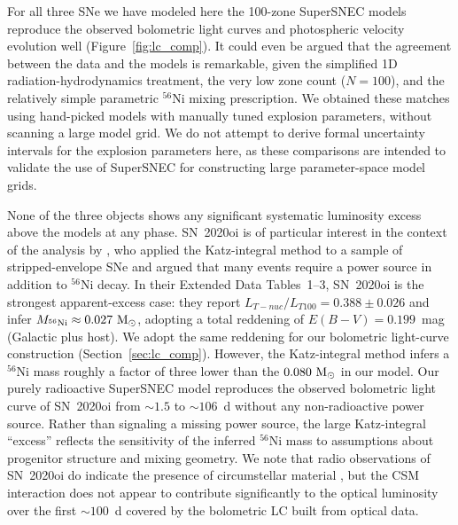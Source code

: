 \documentclass[twocolumn,linenumbers]{aastex701}
\begin{document}
For all three SNe we have modeled here the 100-zone SuperSNEC models reproduce the observed bolometric light curves and photospheric velocity evolution well (Figure~\ref{fig:lc_comp}). It could even be argued that the agreement between the data and the models is remarkable, given the simplified 1D radiation-hydrodynamics treatment, the very low zone count ($N = 100$), and the relatively simple parametric $^{56}$Ni mixing prescription. We obtained these matches using hand-picked models with manually tuned explosion parameters, without scanning a large model grid. We do not attempt to derive formal uncertainty intervals for the explosion parameters here, as these comparisons are intended to validate the use of SuperSNEC for constructing large parameter-space model grids. 

None of the three objects shows any significant systematic luminosity excess above the models at any phase. SN~2020oi is of particular interest in the context of the analysis by \citet{Rodriguez2024}, who applied the Katz-integral method to a sample of stripped-envelope SNe and argued that many events require a power source in addition to $^{56}$Ni decay. In their Extended Data Tables~1--3, SN~2020oi is the strongest apparent-excess case: they report $L_{T-nuc}/L_{T100} = 0.388 \pm 0.026$ and infer $M_{^{56}\mathrm{Ni}} \approx 0.027~{\rm M}_\odot$, adopting a total reddening of $E(B-V) = 0.199$~mag (Galactic plus host). We adopt the same reddening for our bolometric light-curve construction (Section~\ref{sec:lc_comp}). However, the Katz-integral method infers a $^{56}$Ni mass roughly a factor of three lower than the $0.080~{\rm M}_\odot$ in our model. Our purely radioactive SuperSNEC model reproduces the observed bolometric light curve of SN~2020oi from ${\sim}1.5$ to ${\sim}106$~d without any non-radioactive power source. Rather than signaling a missing power source, the large Katz-integral ``excess'' reflects the sensitivity of the inferred $^{56}$Ni mass to assumptions about progenitor structure and mixing geometry. We note that radio observations of SN~2020oi do indicate the presence of circumstellar material \citep{Horesh2020,Maeda2021}, but the CSM interaction does not appear to contribute significantly to the optical luminosity over the first ${\sim}100$~d covered by the bolometric LC built from optical data.
\end{document}
